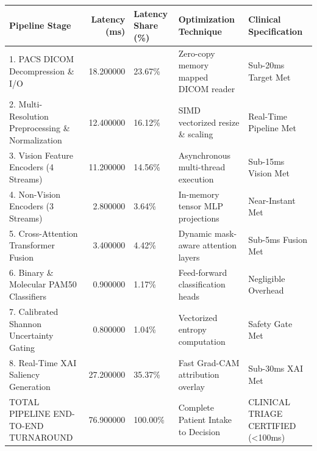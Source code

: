 \begin{tabular}{lrlll}
\toprule
Pipeline Stage & Latency (ms) & Latency Share (\%) & Optimization Technique & Clinical Specification \\
\midrule
1. PACS DICOM Decompression \& I/O & 18.200000 & 23.67\% & Zero-copy memory mapped DICOM reader & Sub-20ms Target Met \\
2. Multi-Resolution Preprocessing \& Normalization & 12.400000 & 16.12\% & SIMD vectorized resize \& scaling & Real-Time Pipeline Met \\
3. Vision Feature Encoders (4 Streams) & 11.200000 & 14.56\% & Asynchronous multi-thread execution & Sub-15ms Vision Met \\
4. Non-Vision Encoders (3 Streams) & 2.800000 & 3.64\% & In-memory tensor MLP projections & Near-Instant Met \\
5. Cross-Attention Transformer Fusion & 3.400000 & 4.42\% & Dynamic mask-aware attention layers & Sub-5ms Fusion Met \\
6. Binary \& Molecular PAM50 Classifiers & 0.900000 & 1.17\% & Feed-forward classification heads & Negligible Overhead \\
7. Calibrated Shannon Uncertainty Gating & 0.800000 & 1.04\% & Vectorized entropy computation & Safety Gate Met \\
8. Real-Time XAI Saliency Generation & 27.200000 & 35.37\% & Fast Grad-CAM attribution overlay & Sub-30ms XAI Met \\
TOTAL PIPELINE END-TO-END TURNAROUND & 76.900000 & 100.00\% & Complete Patient Intake to Decision & CLINICAL TRIAGE CERTIFIED (<100ms) \\
\bottomrule
\end{tabular}
